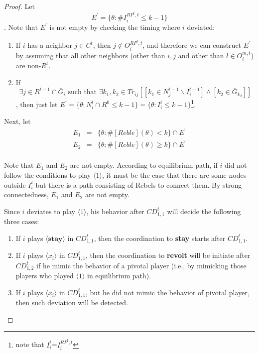\documentclass[12pt,letterpaper]{article}
\theoremstyle{definition}
\theoremstyle{remark}
\theoremstyle{claim}
\begin{document}
\begin{proof}


Let
\[E^{'}=\{\theta:\#I^{RP^t,t}_i\leq k-1\}\]
. Note that $E^{'}$ is not empty by checking the timing where $i$ deviated:
\begin{enumerate}
\item If $i$ has a neighbor $j\in C^t$, then $j\not\in O^{RP^t,t}_i$, and therefore we can construct $E^{'}$ by assuming that all other neighbors (other than $i,j$ and other than $l\in O^{m,t}_i$) are non-$R^t$.
\item If \[\exists j\in R^{t-1}\cap \bar{G}_i \text{ such that } \exists k_1,k_2\in Tr_{ij}[[k_1\in N^{t-1}_j\backslash I^{t-1}_i] \wedge [k_2\in \bar{G}_{k_2}]]\], then just let $E^{'}=\{\theta: N^t_i\cap R^0\leq k-1\}=\{\theta: I^t_i\leq k-1\}$\footnote{note that $I^t_i$=$I^{RP^t,t}_i$}.
\end{enumerate}

Next, let 
\begin{eqnarray*}
E_1&=&\{\theta: \#[Reble](\theta)<k\}\cap E^{'}\\
E_2&=&\{\theta: \#[Reble](\theta)\geq k\}\cap E^{'}\\
\end{eqnarray*}

Note that $E_1$ and $E_2$ are not empty. According to equilibrium path, if $i$ did not follow the conditions to play $\langle 1 \rangle$, it must be the case that there are some nodes outside $I^t_i$ but there is a path consisting of Rebels to connect them. By strong connectedness, $E_1$ and $E_2$ are not empty.

Since $i$ deviates to play $\langle 1 \rangle$, his behavior after $CD^t_{1,1}$ will decide the following three cases:
\begin{enumerate}
\item If $i$ plays $\langle \textbf{stay} \rangle$ in $CD^t_{1,1}$, then the coordination to \textbf{stay} starts after $CD^t_{1,1}$.
\item If $i$ plays $\langle x_i \rangle$ in $CD^t_{1,1}$, then the coordination to \textbf{revolt} will be initiate after $CD^t_{1,2}$ if he mimic the behavior of a pivotal player (i.e., by mimicking those players who played $\langle 1 \rangle$ in equilibrium path).
\item If $i$ plays $\langle x_i \rangle$ in $CD^t_{1,1}$, but he did not mimic the behavior of pivotal player, then such deviation will be detected.
\end{enumerate}


\end{proof}
\end{document}
